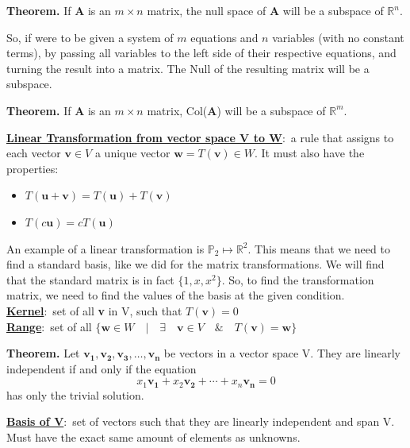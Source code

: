 \documentclass[nobib]{tufte-handout}
\newcommand{\defn}[2]{\underline{\noindent\textbf{#1}}:\ #2}
\begin{document}
\begin{center}
    \textbf{Theorem.} If \textbf{A} is an $m \times n$ matrix, the null space of \textbf{A} will be a subspace of $\mathbb{R}^n$.\\
\end{center}
So, if were to be given a system of $m$ equations and $n$ variables (with no constant terms), by passing all variables to the left side of their respective equations, and turning the result into a matrix. The Null of the resulting matrix will be a subspace.\\
\begin{center}
    \textbf{Theorem.} If \textbf{A} is an $m \times n$ matrix, Col(\textbf{A}) will be a subspace of $\mathbb{R}^m$.\\
\end{center}
\defn{Linear Transformation from vector space V to W}{a rule that assigns to each vector $\mathbf{v}\in V$ a unique vector $\mathbf{w} = T(\mathbf{v}) \in W$.} It must also have the properties:\\
\begin{itemize}
    \item $T(\mathbf{u+v}) = T(\mathbf{u})+T(\mathbf{v})$
    \item $T(c\mathbf{u}) = cT(\mathbf{u})$ 
\end{itemize}
An example of a linear transformation is $\mathbb{P}_2 \mapsto \mathbb{R}^2$. This means that we need to find a standard basis, like we did for the matrix transformations. We will find that the standard matrix is in fact $\{1,x,x^2\}$. So, to find the transformation matrix, we need to find the values of the basis at the given condition.\\
\defn{Kernel}{set of all \textbf{v} in V, such that $T(\textbf{v})=0$}\\
\defn{Range}{set of all $\{\mathbf{w}\in W\quad |\quad \exists \quad\mathbf{v} \in V \quad\&\quad T(\mathbf{v}) = \mathbf{w}\}$}\\
\begin{center}
    \textbf{Theorem.} Let $\mathbf{v_1, v_2, v_3, \ldots, v_n}$ be vectors in a vector space V. They are linearly independent if and only if the equation
    \begin{equation*}
        x_1\mathbf{v_1}+x_2\mathbf{v_2}+\cdots+x_n\mathbf{v_n}= 0
    \end{equation*}
    has only the trivial solution.
\end{center}
\defn{Basis of V}{set of vectors such that they are linearly independent and span V. Must have the exact same amount of elements as unknowns}.\\
\end{document}
